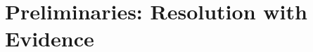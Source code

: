 \documentclass{llncs}
\newcommand{\knote}[1]{\todo[inline, color=blue!20]{#1}}
\begin{document}
\begin{comment}
Unfortunitely, circularity is just one way for the evidence construction to be diverging,
\knote{diverging occurs for the first time here. If different from non-termination -- explain how, if not different -- just use non-termination consistently }
there are nontrivial code that will result in divergent without forming any cycle.
\knote{I do not understand that sentence as given}
Fig. \ref{fig:ex1} is a generic definition of multi-way trees where every node at level $n$ has $0$ or $2^n$ subtrees. The instance declarations is what one would write given the data type declarations. However, the function \texttt{test} will make the type checker diverge, since it gives rise to the constraint \texttt{Eq (Fix (GSeqF ()) Pair)}, which has the following context reduction trace: 

\knote{check the above sentence: again diverge versus never terminate, does test on its own gives divergence? in which sense   \texttt{Eq (Fix (GSeqF ()) Pair)} is a constraint? do you really want to call it a constriant -- then this needs some semi-formal explanation...  }

\begin{center}
  {\footnotesize
    \noindent $\{\texttt{Eq (Fix (GSeqF ()) Pair)}\} \to^* \{\texttt{Eq (Fix (Comp Pair (GSeqF ())) Pair)}\} \to^* \{\texttt{Eq (Fix (Comp Pair (Comp Pair (GSeqF ()))) Pair)}\} \to^* ... $ 
  }
\end{center}

\noindent We can see the constraint is periodically increased by \texttt{(Comp Pair)}. But if we look at the definition of \texttt{test}, it is comparing two finite data, we would want it to be type checked and evaluated to \texttt{False}! 
Internally, \texttt{test} is represented as:

{\footnotesize
\noindent \texttt{test = (==) d (Fix (Cons () (Fix (Comp (Pair Nil Nil))))) (Fix Nil)}
}

\noindent where \texttt{d} is some corecursive evidence that is used finitely by the context

\noindent \texttt{ (==) * (Fix (Cons () (Fix (Comp (Pair Nil Nil))))) (Fix Nil)}. The divergent of GHC in this case means the compiler can not construct such corecursive evidence. 

\end{comment}
\section{Preliminaries: Resolution with Evidence}
\label{preliminary}
\end{document}

